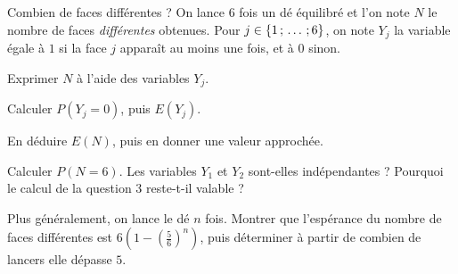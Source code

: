 \begin{exercice}[3]{Combien de faces différentes ?}
On lance $6$ fois un dé équilibré et l'on note $N$ le nombre de faces \emph{différentes} obtenues. Pour $j\in\left\{1\,{;}\,\dots\,{;}\,6\right\}$,
on note $Y_j$ la variable égale à $1$ si la face $j$ apparaît au moins une fois, et à $0$ sinon.
\begin{questions}
  \item Exprimer $N$ à l'aide des variables $Y_j$.
  \item Calculer $P(Y_j=0)$, puis $E(Y_j)$.
  \item En déduire $E(N)$, puis en donner une valeur approchée.
  \item Calculer $P(N=6)$. Les variables $Y_1$ et $Y_2$ sont-elles indépendantes ? Pourquoi le calcul de la question 3 reste-t-il valable ?
  \item Plus généralement, on lance le dé $n$ fois. Montrer que l'espérance du nombre de faces différentes est $6\left(1-\left(\frac56\right)^{n}\right)$,
    puis déterminer à partir de combien de lancers elle dépasse $5$.
\end{questions}
\end{exercice}
